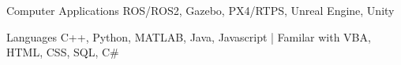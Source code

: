 
\begin{cvskills}
  \cvskill
    {Computer Applications} %
    {ROS/ROS2, Gazebo, PX4/RTPS, Unreal Engine, Unity} %

  \cvskill
    {Languages} %
    {C++, Python, MATLAB, Java, Javascript | Familar with VBA, HTML, CSS, SQL, C\#} %
\end{cvskills}
